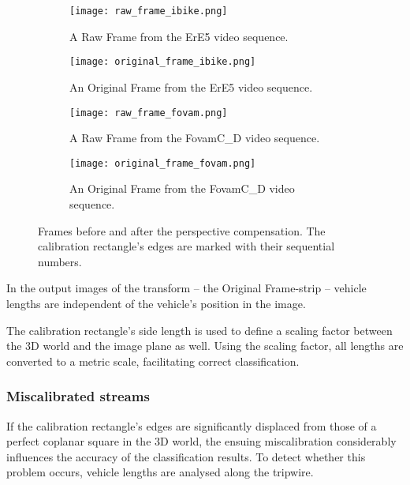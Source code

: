 \begin{figure}[!t]
	\centering
		\begin{subfigure}[b]{0.4\textwidth}
			\texttt{[image: raw\_frame\_ibike.png]}
			\caption{A Raw Frame from the ErE5 video sequence.}
		\end{subfigure}
		\quad
		\begin{subfigure}[b]{0.4\textwidth}
			\texttt{[image: original\_frame\_ibike.png]}
			\caption{An Original Frame from the ErE5 video sequence.}
		\end{subfigure}
		\hfill
		\begin{subfigure}[b]{0.4\textwidth}
			\texttt{[image: raw\_frame\_fovam.png]}
			\caption{A Raw Frame from the FovamC\_D video sequence.}
		\end{subfigure}
		\quad
		\begin{subfigure}[b]{0.4\textwidth}
			\texttt{[image: original\_frame\_fovam.png]}
			\caption{An Original Frame from the FovamC\_D video sequence.}
		\end{subfigure}
		
		\caption{Frames before and after the perspective compensation. The calibration rectangle's edges are marked with their sequential numbers.\label{fig:perscomp}}
\end{figure}

In the output images of the transform -- the Original Frame-strip --  vehicle lengths are independent of the vehicle's position in the image. 

The calibration rectangle's side length is used to define a scaling factor between the 3D world and the image plane as well.
Using the scaling factor, all lengths are converted to a metric scale, facilitating correct classification.

\subsubsection{Miscalibrated streams}
If the calibration rectangle's edges are significantly displaced from those of a perfect coplanar square in the 3D world, the ensuing miscalibration considerably influences the accuracy of the classification results.
To detect whether this problem occurs, vehicle lengths are analysed along the tripwire.


